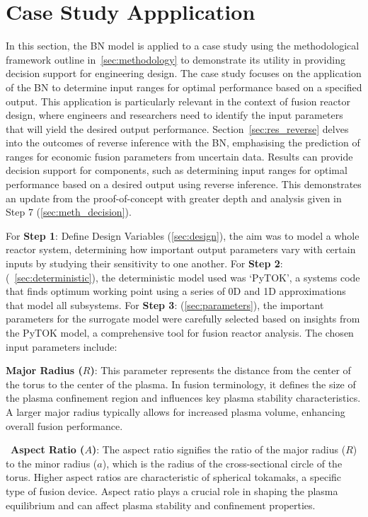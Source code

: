\documentclass[journal]{IEEEtran}
\begin{document}
\section{Case Study Appplication}\label{sec:res_decision} 

In this section, the BN model is applied to a case study using the methodological framework outline in~\ref{sec:methodology} to demonstrate its utility in providing decision support for engineering design. The case study focuses on the application of the BN to determine input ranges for optimal performance based on a specified output. This application is particularly relevant in the context of fusion reactor design, where engineers and researchers need to identify the input parameters that will yield the desired output performance. Section~\ref{sec:res_reverse} delves into the outcomes of reverse inference with the BN, emphasising the prediction of ranges for economic fusion parameters from uncertain data. Results can provide decision support for components, such as determining input ranges for optimal performance based on a desired output using reverse inference. This demonstrates an update from the proof-of-concept with greater depth and analysis given in Step 7 (\ref{sec:meth_decision}).

For \textbf{Step 1}: Define Design Variables (\ref{sec:design}), the aim was to model a whole reactor system, determining how important output parameters vary with certain inputs by studying their sensitivity to one another. For \textbf{Step 2}: (~\ref{sec:deterministic}), the deterministic  model used was `PyTOK', a systems code that finds optimum working point using a series of 0D and 1D approximations that model all subsystems. For \textbf{Step 3}: (\ref{sec:parameters}), the important parameters for the surrogate model were carefully selected based on insights from the PyTOK model, a comprehensive tool for fusion reactor analysis. The chosen input parameters include: 

\textbf{Major Radius ($R$)}: This parameter represents the distance from the center of the torus to the center of the plasma. In fusion terminology, it defines the size of the plasma confinement region and influences key plasma stability characteristics. A larger major radius typically allows for increased plasma volume, enhancing overall fusion performance.

~\textbf{Aspect Ratio ($A$)}: The aspect ratio signifies the ratio of the major radius ($R$) to the minor radius ($a$), which is the radius of the cross-sectional circle of the torus. Higher aspect ratios are characteristic of spherical tokamaks, a specific type of fusion device. Aspect ratio plays a crucial role in shaping the plasma equilibrium and can affect plasma stability and confinement properties.
\end{document}
